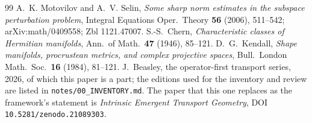\begin{thebibliography}{99}
 A.~K. Motovilov and A.~V. Selin, \emph{Some sharp norm estimates in the subspace perturbation problem}, Integral Equations Oper.\ Theory \textbf{56} (2006), 511--542; arXiv:math/0409558; Zbl 1121.47007.
 S.-S.~Chern, \emph{Characteristic classes of Hermitian manifolds}, Ann.\ of Math.\ \textbf{47} (1946), 85--121.
 D.~G.~Kendall, \emph{Shape manifolds, procrustean metrics, and complex projective spaces}, Bull.\ London Math.\ Soc.\ \textbf{16} (1984), 81--121.
 J.~Beasley, the operator-first transport series, 2026, of which this paper is a part; the editions used for the inventory and review are listed in \texttt{notes/00\_INVENTORY.md}. The paper that this one replaces as the framework's statement is \emph{Intrinsic Emergent Transport Geometry}, DOI \texttt{10.5281/zenodo.21089303}.
\end{thebibliography}
